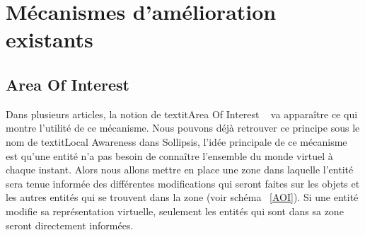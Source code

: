 \section{Mécanismes d'amélioration existants}
	\subsection{Area Of Interest}
	Dans plusieurs articles, la notion de textit{Area Of Interest} ~\cite{1403002,1267692,1015507} va apparaître ce qui montre l'utilité de ce mécanisme. Nous pouvons déjà retrouver ce principe sous le nom de textit{Local Awareness} dans Sollipsis, l'idée principale de ce mécanisme est qu'une entité n'a pas besoin de connaître l'ensemble du monde virtuel à chaque instant. Alors nous allons mettre en place une zone dans laquelle l'entité sera tenue informée des différentes modifications qui seront faites sur les objets et les autres entités qui se trouvent dans la zone (voir schéma ~\ref{AOI}). Si une entité modifie sa représentation virtuelle, seulement les entités qui sont dans sa zone seront directement informées.\\

